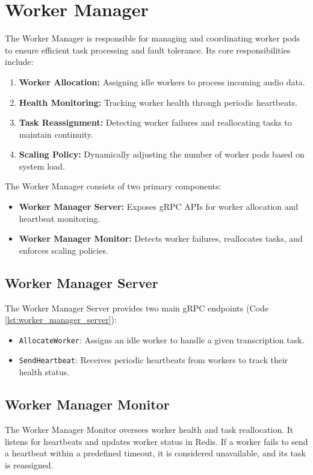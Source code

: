 \section{Worker Manager} \label{section:worker_manager}
The Worker Manager is responsible for managing and coordinating worker pods to ensure efficient task processing and fault tolerance. Its core responsibilities include:
\begin{enumerate}
  \item \textbf{Worker Allocation:} Assigning idle workers to process incoming audio data.
  \item \textbf{Health Monitoring:} Tracking worker health through periodic heartbeats.
  \item \textbf{Task Reassignment:} Detecting worker failures and reallocating tasks to maintain continuity.
  \item \textbf{Scaling Policy:} Dynamically adjusting the number of worker pods based on system load.
\end{enumerate}


The Worker Manager consists of two primary components:
\begin{itemize}
    \item \textbf{Worker Manager Server:} Exposes gRPC APIs for worker allocation and heartbeat monitoring.
    \item \textbf{Worker Manager Monitor:} Detects worker failures, reallocates tasks, and enforces scaling policies.
\end{itemize}

\subsection{Worker Manager Server}
The Worker Manager Server provides two main gRPC endpoints (Code \ref{lst:worker_manager_server}):
\begin{itemize}
    \item \texttt{AllocateWorker}: Assigns an idle worker to handle a given transcription task.
    \item \texttt{SendHeartbeat}: Receives periodic heartbeats from workers to track their health status.
\end{itemize}


\subsection{Worker Manager Monitor}
The Worker Manager Monitor oversees worker health and task reallocation. It listens for heartbeats and updates worker status in Redis. If a worker fails to send a heartbeat within a predefined timeout, it is considered unavailable, and its task is reassigned. 


